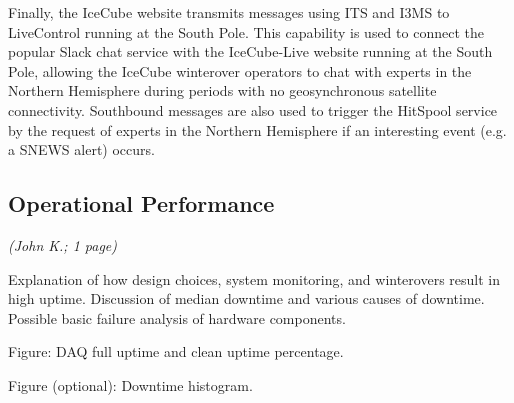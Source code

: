 Finally, the IceCube website transmits messages using ITS and I3MS to LiveControl running at the South Pole.  This capability is used to connect
the popular Slack chat service with the IceCube-Live website running at the South Pole, allowing the IceCube winterover operators to chat with
experts in the Northern Hemisphere during periods with no geosynchronous satellite connectivity.  Southbound messages are also used to trigger
the HitSpool service by the request of experts in the Northern Hemisphere if an interesting event (e.g. a SNEWS alert) occurs.

\subsection{Operational Performance}
\textsl{(John K.; 1 page)}

Explanation of how design choices, system monitoring, and winterovers result in
high uptime.  Discussion of median downtime and various causes of downtime.
Possible basic failure analysis of hardware components.  

Figure: DAQ full uptime and clean uptime percentage.

Figure (optional): Downtime histogram.  
